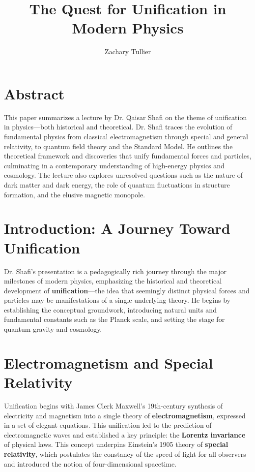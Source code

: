 \documentclass[12pt]{article}
\begin{document}
\singlespacing  %
\title{The Quest for Unification in Modern Physics}

\author[1]{Zachary Tullier}
\date{}
\maketitle


\section*{Abstract}
This paper summarizes a lecture by Dr. Qaisar Shafi on the theme of unification in physics---both historical and theoretical. Dr. Shafi traces the evolution of fundamental physics from classical electromagnetism through special and general relativity, to quantum field theory and the Standard Model. He outlines the theoretical framework and discoveries that unify fundamental forces and particles, culminating in a contemporary understanding of high-energy physics and cosmology. The lecture also explores unresolved questions such as the nature of dark matter and dark energy, the role of quantum fluctuations in structure formation, and the elusive magnetic monopole.

\section*{Introduction: A Journey Toward Unification}
Dr. Shafi’s presentation is a pedagogically rich journey through the major milestones of modern physics, emphasizing the historical and theoretical development of \textbf{unification}---the idea that seemingly distinct physical forces and particles may be manifestations of a single underlying theory. He begins by establishing the conceptual groundwork, introducing natural units and fundamental constants such as the Planck scale, and setting the stage for quantum gravity and cosmology.

\section*{Electromagnetism and Special Relativity}
Unification begins with James Clerk Maxwell’s 19th-century synthesis of electricity and magnetism into a single theory of \textbf{electromagnetism}, expressed in a set of elegant equations. This unification led to the prediction of electromagnetic waves and established a key principle: the \textbf{Lorentz invariance} of physical laws. This concept underpins Einstein’s 1905 theory of \textbf{special relativity}, which postulates the constancy of the speed of light for all observers and introduced the notion of four-dimensional spacetime.
\end{document}
